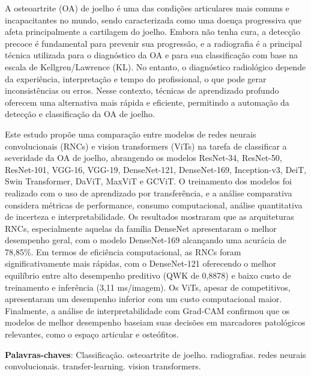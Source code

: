 
\setlength{\absparsep}{18pt} %
\begin{resumo}
  A osteoartrite (OA) de joelho é uma das condições articulares mais comuns e incapacitantes no mundo, sendo caracterizada como uma doença progressiva que afeta principalmente a cartilagem do joelho. Embora não tenha cura, a detecção precoce é fundamental para prevenir sua progressão, e a radiografia é a principal técnica utilizada para o diagnóstico da OA e para sua classificação com base na escala de Kellgren/Lawrence (KL). No entanto, o diagnóstico radiológico depende da experiência, interpretação e tempo do profissional, o que pode gerar inconsistências ou erros. Nesse contexto, técnicas de aprendizado profundo oferecem uma alternativa mais rápida e eficiente, permitindo a automação da detecção e classificação da OA de joelho.

  Este estudo propõe uma comparação entre modelos de redes neurais convolucionais (RNCs) e vision transformers (ViTs) na tarefa de classificar a severidade da OA de joelho, abrangendo os modelos ResNet-34, ResNet-50, ResNet-101, VGG-16, VGG-19, DenseNet-121, DenseNet-169, Inception-v3, DeiT, Swin Transformer, DaViT, MaxViT e GCViT. O treinamento dos modelos foi realizado com o uso de aprendizado por transferência, e a análise comparativa considera métricas de performance, consumo computacional, análise quantitativa de incerteza e interpretabilidade. Os resultados mostraram que as arquiteturas RNCs, especialmente aquelas da família DenseNet apresentaram o melhor desempenho geral, com o modelo DenseNet-169 alcançando uma acurácia de 78,85\%. Em termos de eficiência computacional, as RNCs foram significativamente mais rápidas, com o DenseNet-121 oferecendo o melhor equilíbrio entre alto desempenho preditivo (QWK de 0,8878) e baixo custo de treinamento e inferência (3,11 ms/imagem). Os ViTs, apesar de competitivos, apresentaram um desempenho inferior com um custo computacional maior. Finalmente, a análise de interpretabilidade com Grad-CAM confirmou que os modelos de melhor desempenho baseiam suas decisões em marcadores patológicos relevantes, como o espaço articular e osteófitos.

  \vspace{\onelineskip}

 \textbf{Palavras-chaves}: Classificação. osteoartrite de joelho. radiografias. redes neurais convolucionais. transfer-learning. vision transformers.
\end{resumo}

